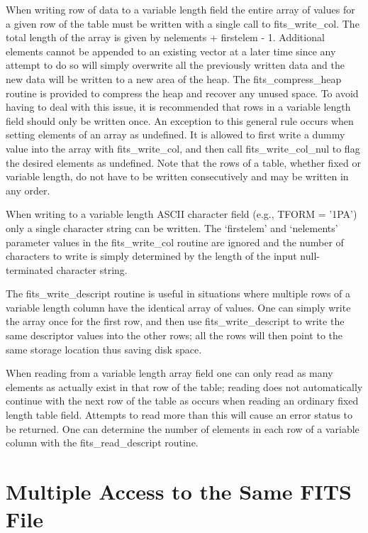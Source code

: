 \documentclass[11pt]{book}
\begin{document}
When writing row of data to a variable length field the entire array of values for
a given row of the table must be written with a single call to
fits\_write\_col.
The total length of the array is given by nelements
+ firstelem - 1.  Additional elements cannot be appended to an existing
vector at a later time since any attempt to do so will simply overwrite
all the previously written data and the new data will be
written to a new area of the heap.  The fits\_compress\_heap routine
is provided to compress the heap and recover any unused space.
To avoid having to deal with this issue, it is recommended
that rows in a variable length field should only be written once.
An exception to
this general rule occurs when setting elements of an array as
undefined.  It is allowed to first write a dummy value into the array with
fits\_write\_col, and then call fits\_write\_col\_nul to flag the
desired elements as undefined. Note that the rows of a table,
whether fixed or variable length, do not have to be written
consecutively and may be written in any order.

When writing to a variable length ASCII character field (e.g., TFORM =
'1PA') only a single character string can be written.  The `firstelem'
and `nelements' parameter values in the fits\_write\_col routine are
ignored and the number of characters to write is simply determined by
the length of the input null-terminated character string.

The fits\_write\_descript routine is useful in situations where
multiple rows of a variable length column have the identical array of
values.  One can simply write the array once for the first row, and
then use fits\_write\_descript to write the same descriptor values into
the other rows;  all the rows will then point to the same storage
location thus saving disk space.

When reading from a variable length array field one can only read as
many elements as actually exist in that row of the table; reading does
not automatically continue with the next row of the table as occurs
when reading an ordinary fixed length table field.  Attempts to read
more than this will cause an error status to be returned.  One can
determine the number of elements in each row of a variable column with
the fits\_read\_descript routine.


\section{Multiple Access to the Same FITS File}
\end{document}
